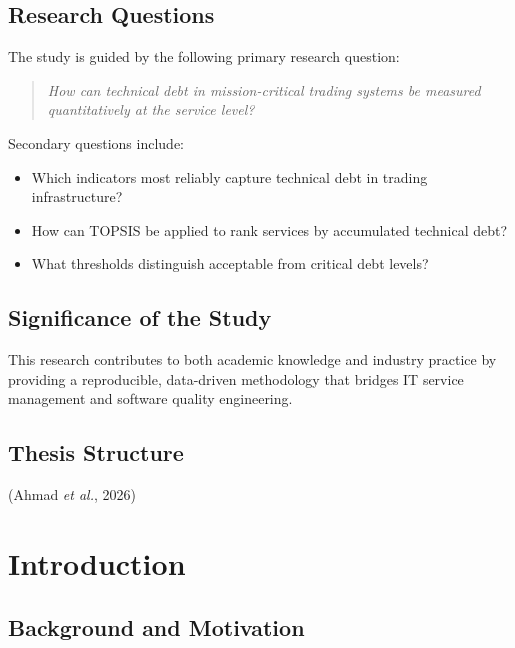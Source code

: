 \documentclass[
  11pt,
  letterpaper,
  11pt,
  english,
  onehalfspacing,
  headsepline]{MastersDoctoralThesis}
\providecommand{\tightlist}{%
  \setlength{\itemsep}{0pt}\setlength{\parskip}{0pt}}
\begin{document}
\section{Research Questions}\label{research-questions}

The study is guided by the following primary research question:

\begin{quote}
\emph{How can technical debt in mission-critical trading systems be
measured quantitatively at the service level?}
\end{quote}

Secondary questions include:

\begin{itemize}
\tightlist
\item
  Which indicators most reliably capture technical debt in trading
  infrastructure?
\item
  How can TOPSIS be applied to rank services by accumulated technical
  debt?
\item
  What thresholds distinguish acceptable from critical debt levels?
\end{itemize}

\section{Significance of the Study}\label{significance-of-the-study}

This research contributes to both academic knowledge and industry
practice by providing a reproducible, data-driven methodology that
bridges IT service management and software quality engineering.

\section{Thesis Structure}\label{thesis-structure}

(Ahmad \emph{et al.}, 2026)


\chapter{Introduction}\label{introduction-1}

\section{Background and Motivation}\label{background-and-motivation-1}
\end{document}
